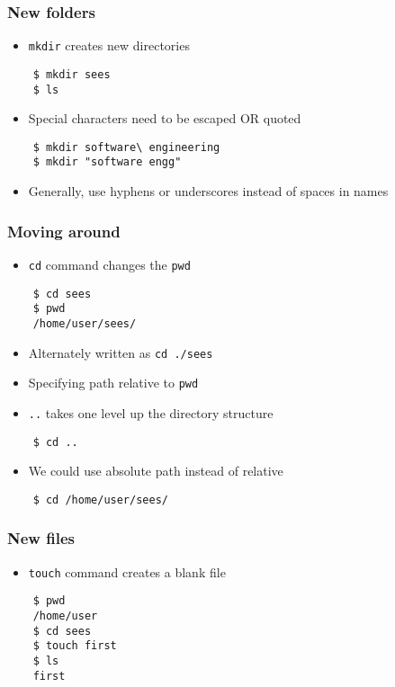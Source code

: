 \documentclass[12pt,compress]{beamer}
\begin{document}
\begin{frame}[fragile]
  \frametitle{New folders}
  \begin{itemize}
  \item \texttt{mkdir} creates new directories
  \end{itemize}
  \begin{lstlisting}
    $ mkdir sees
    $ ls
  \end{lstlisting}
  \begin{itemize}
  \item Special characters need to be escaped OR quoted
  \end{itemize}
  \begin{lstlisting}
    $ mkdir software\ engineering
    $ mkdir "software engg"
  \end{lstlisting} 
  \begin{itemize}
  \item Generally, use hyphens or underscores instead of spaces in names
  \end{itemize}
\end{frame}

\begin{frame}[fragile]
  \frametitle{Moving around}
  \begin{itemize}
  \item \texttt{cd} command changes the \texttt{pwd}
  \end{itemize}
  \begin{lstlisting}
    $ cd sees
    $ pwd 
    /home/user/sees/
  \end{lstlisting}
  \begin{itemize}
  \item Alternately written as \texttt{cd ./sees}
  \item Specifying path relative to \texttt{pwd}
  \item \texttt{..} takes one level up the directory structure
  \end{itemize}
  \begin{lstlisting}
    $ cd ..
  \end{lstlisting} %
  \begin{itemize}
  \item We could use absolute path instead of relative
  \end{itemize}
  \begin{lstlisting}
    $ cd /home/user/sees/
  \end{lstlisting} %
\end{frame}

\begin{frame}[fragile]
  \frametitle{New files}
  \begin{itemize}
  \item \texttt{touch} command creates a blank file
  \end{itemize}
  \begin{lstlisting}
    $ pwd
    /home/user
    $ cd sees
    $ touch first
    $ ls 
    first
  \end{lstlisting} %
\end{frame}
\end{document}
